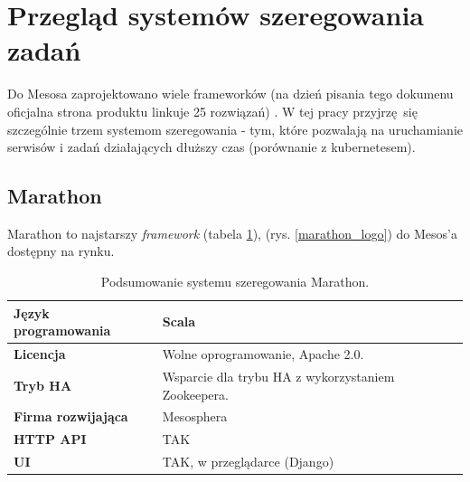 \documentclass[10pt,a4paper,titlepage,twoside]{report}
\begin{document}
\newpage

\section{Przegląd systemów szeregowania zadań}

Do Mesosa zaprojektowano wiele frameworków (na dzień pisania tego dokumenu oficjalna strona produktu linkuje 25 rozwiązań) \cite{ad41}. W tej pracy przyjrzę się szczególnie trzem systemom szeregowania - tym, które pozwalają na uruchamianie serwisów i zadań działających dłuższy czas (porównanie z kubernetesem). 

\subsection{Marathon}

Marathon to najstarszy \textit{framework} (tabela \ref{marathon_info}), (rys. \ref{marathon_logo}) do Mesos'a dostępny na rynku. 
\begin{table}[!h]
\caption{Podsumowanie systemu szeregowania Marathon.}
\label{marathon_info}
\centering
\begin{tabular}{|p{4cm}|p{6cm}|}
  \hline
  \textbf{Język programowania} & Scala \\
  \hline
  \textbf{Licencja} & Wolne oprogramowanie, Apache 2.0. \\
  \hline
  \textbf{Tryb HA} & Wsparcie dla trybu HA z wykorzystaniem Zookeepera. \\
  \hline
  \textbf{Firma rozwijająca} & Mesosphera \\
  \hline
  \textbf{HTTP API} & TAK \\
  \hline
  \textbf{UI} & TAK, w przeglądarce (Django) \\
  \hline
\end{tabular}
\end{table}
\end{document}
